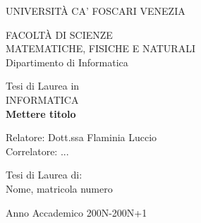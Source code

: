 \thispagestyle{empty}
\vspace*{-1.5cm} 
\begin{center}
  \large
  UNIVERSIT\`A CA' FOSCARI VENEZIA\\
 \vspace*{1.3cm}


  FACOLT\`A DI SCIENZE \\
  MATEMATICHE, FISICHE E NATURALI\\
 \vspace*{0.3cm}
  \normalsize
  Dipartimento di Informatica\\

  \vspace*{0.3cm} \LARGE



  Tesi di Laurea in\\
 INFORMATICA\\
 \vspace*{.75truecm} \large
\bf{Mettere titolo}
\end{center}
\vspace*{3.0cm} \large
\begin{flushleft}

  Relatore: Dott.ssa Flaminia Luccio \\
  Correlatore: ... 

\end{flushleft}
\vspace*{1.0cm}
\begin{flushright}


  Tesi di Laurea di:\\ Nome, matricola numero \\ 
		       
\end{flushright}
\vspace*{0.5cm}
\begin{center}



  Anno Accademico 200N-200N+1
\end{center} \clearpage

